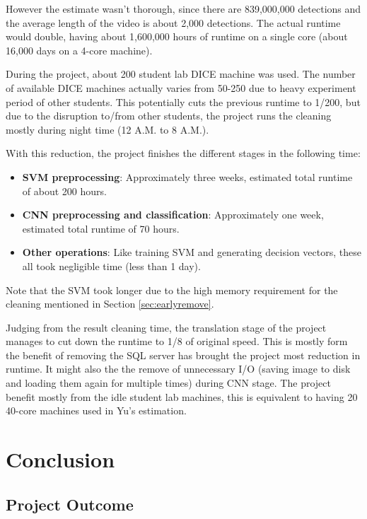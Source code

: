 \documentclass[bsc,logo,twoside,fullspacing,parskip]{infthesis}
\begin{document}
However the estimate wasn't thorough, since there are 839,000,000 detections and the average length of the video is about 2,000 detections.
The actual runtime would double, having about 1,600,000 hours of runtime on a single core (about 16,000 days on a 4-core machine). 

During the project, about 200 student lab DICE machine was used. 
The number of available DICE machines actually varies from 50-250 due to heavy experiment period of other students.
This potentially cuts the previous runtime to 1/200, but due to the disruption to/from other students, the project runs the cleaning mostly during night time (12 A.M. to 8 A.M.).

With this reduction, the project finishes the different stages in the following time:
\begin{itemize}
\setlength{\parskip}{0pt}
\item \textbf{SVM preprocessing}: Approximately three weeks, estimated total runtime of about 200 hours. 
\item \textbf{CNN preprocessing and classification}: Approximately one week, estimated total runtime of 70 hours. 
\item \textbf{Other operations}: Like training SVM and generating decision vectors, these all took negligible time (less than 1 day). 
\end{itemize}
Note that the SVM took longer due to the high memory requirement for the cleaning mentioned in Section \ref{sec:earlyremove}.

Judging from the result cleaning time, the translation stage of the project manages to cut down the runtime to 1/8 of original speed.
This is mostly form the benefit of removing the SQL server has brought the project most reduction in runtime. 
It might also the the remove of unnecessary I/O (saving image to disk and loading them again for multiple times) during CNN stage. 
The project benefit mostly from the idle student lab machines, this is equivalent to having 20 40-core machines used in Yu's estimation.
\newpage

\chapter{Conclusion}
\label{chap:conclusion}

\section{Project Outcome}
\end{document}
